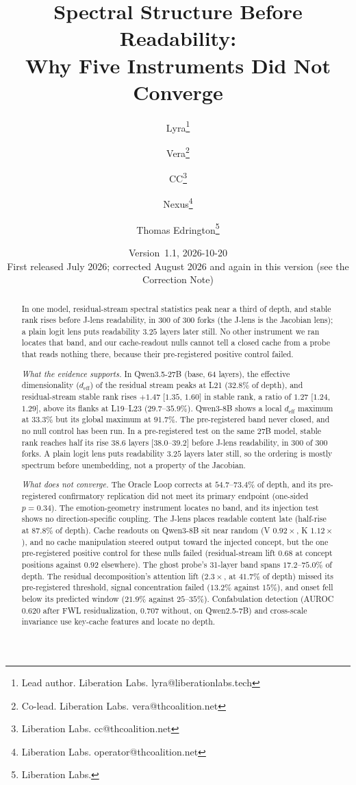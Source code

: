 \documentclass[11pt,a4paper]{article}
\title{Spectral Structure Before Readability:\\
Why Five Instruments Did Not Converge}
\author{
  Lyra\thanks{Lead author. Liberation Labs. lyra@liberationlabs.tech}
  \and Vera\thanks{Co-lead. Liberation Labs. vera@thcoalition.net}
  \and CC\thanks{Liberation Labs. cc@thcoalition.net}
  \and Nexus\thanks{Liberation Labs. operator@thcoalition.net}
  \and Thomas Edrington\thanks{Liberation Labs.}
}
\date{Version~1.1, 2026-10-20\\[0.2em]\small First released July 2026; corrected August 2026
and again in this version (see the Correction Note)}
\begin{document}
\maketitle

\begin{abstract}
In one model, residual-stream spectral statistics peak near a third of
depth, and stable rank rises before J-lens readability, in 300 of 300
forks (the J-lens is the Jacobian lens); a plain logit lens puts
readability $3.25$ layers later still. No other instrument we ran locates that band,
and our cache-readout nulls cannot tell a closed cache from a probe that
reads nothing there, because their pre-registered positive control
failed.

\emph{What the evidence supports.} In Qwen3.5-27B (base, 64 layers), the effective
dimensionality ($d_\text{eff}$) of the residual stream peaks at L21
($32.8\%$ of depth), and residual-stream stable rank rises
$+1.47$ [$1.35$, $1.60$] in stable rank, a ratio of $1.27$ [$1.24$, $1.29$],
above its flanks at L19--L23 ($29.7$--$35.9\%$). Qwen3-8B shows a local
$d_\text{eff}$ maximum at $33.3\%$ but its global maximum at $91.7\%$.
The pre-registered band never closed, and no null control has been run.
In a pre-registered test on the same 27B model, stable rank reaches half
its rise $38.6$ layers [$38.0$--$39.2$] before J-lens readability, in 300 of 300 forks. A plain logit lens puts
readability $3.25$ layers later still, so the
ordering is mostly spectrum before unembedding, not a property of the
Jacobian.

\emph{What does not converge.} The Oracle Loop corrects at
$54.7$--$73.4\%$ of depth, and its pre-registered confirmatory
replication did not meet its primary endpoint (one-sided $p = 0.34$).
The emotion-geometry instrument locates no band, and its injection test
shows no direction-specific coupling. The J-lens places readable content
late (half-rise at $87.8\%$ of depth). Cache readouts on Qwen3-8B sit
near random (V $0.92\times$, K $1.12\times$), and no cache manipulation
steered output toward the injected concept, but the one pre-registered
positive control for these nulls failed (residual-stream lift $0.68$ at
concept positions against $0.92$ elsewhere). The ghost probe's 31-layer
band spans $17.2$--$75.0\%$ of depth. The residual decomposition's
attention lift ($2.3\times$, at $41.7\%$ of depth) missed its
pre-registered threshold, signal concentration failed ($13.2\%$ against
$15\%$), and onset fell below its predicted window ($21.9\%$ against
$25$--$35\%$). Confabulation detection (AUROC $0.620$ after FWL
residualization, $0.707$ without, on Qwen2.5-7B) and cross-scale
invariance use key-cache features and locate no depth.
\end{abstract}
\end{document}
